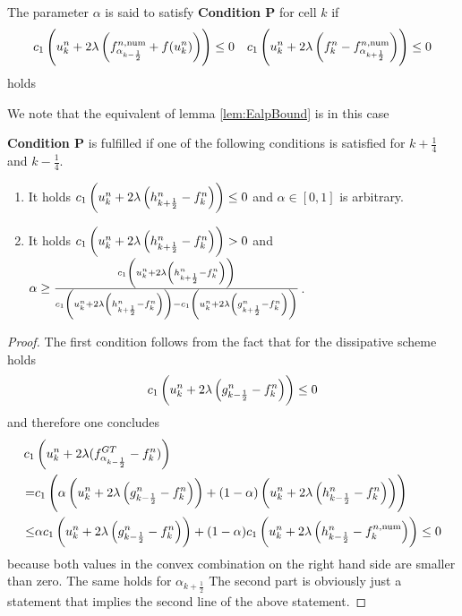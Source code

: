 \begin{definition}
	The parameter $\alpha$ is said to satisfy \textbf{Condition P} for cell $k$ if 
	\[
	\begin{aligned}
	c_1\left (u^n_k + 2\lambda \left(	f^{n, \mathrm{num}}_{\alpha_{k-\frac 1 2}} + f(u^n_k)\right) \right) \leq 0 \quad
	 c_1\left (u^n_k + 2\lambda \left(f^n_{k} - f^{n, \mathrm{num}}_{\alpha_{k+\frac 1 2}}\right) \right) \leq 0
	 \end{aligned}
	\]
	holds
	\end{definition}
We note that the equivalent of lemma \ref{lem:EalpBound} is in this case
\begin{lemma}
	\textbf{Condition P}  is fulfilled if one of the following conditions is satisfied for $k+\frac 1 4$ and $k-\frac 1 4$.
	\begin{enumerate}
		\item It holds $c_1\left (u^n_k + 2\lambda \left(h^n_{k+\frac 1 2} - f^n_k\right) \right) \leq 0$ and $\alpha \in [0, 1]$ is arbitrary.
		\item It holds $c_1\left (u^n_k + 2\lambda \left(h^n_{k+\frac 1 2} - f^n_k\right) \right) > 0$ and $\alpha \geq \frac{c_1\left (u^n_k + 2\lambda \left(h^n_{k+\frac 1 2} - f^n_k\right) \right)}{c_1\left (u^n_k + 2\lambda \left(h^n_{k+\frac 1 2} - f^n_k\right) \right) - c_1\left (u^n_k + 2\lambda \left(g^n_{k+\frac 1 2} - f^n_k\right) \right)}$.
	\end{enumerate}
	\begin{proof}
		The first condition follows from the fact that for the dissipative scheme holds
		\[
		c_1\left (u^n_k + 2\lambda \left(g^n_{k-\frac 1 2} - f^n_k\right) \right) \leq 0
		\]
		and therefore one concludes
		\[
			\begin{aligned}
		c_1 &\left (u^n_k + 2\lambda (f^{GT}_{\alpha_{k-\frac 1 2}} - f^n_k) \right) \\
		= &c_1\left (\alpha\left(u^n_k + 2\lambda \left(g^n_{{k-\frac 1 2}} - f^n_k\right) \right) + (1-\alpha) \left(u^n_k + 2\lambda \left(h^n_{{k-\frac 1 2}} - f^n_k \right)\right)\right) \\
		\leq &\alpha c_1\left (u^n_k + 2\lambda \left(g^n_{k-\frac 1 2} - f^n_k\right) \right) + (1-\alpha)c_1\left ( u^n_k + 2\lambda \left(h^n_{k-\frac 1 2} - f^{n, \mathrm{num}}_k\right) \right) \leq 0
			\end{aligned}
		\]
		because both values in the convex combination on the right hand side are smaller than zero. The same holds for $\alpha_{k+\frac 1 2}$ The second part is obviously just a statement that implies the second line of the above statement.
	\end{proof}
\end{lemma}


